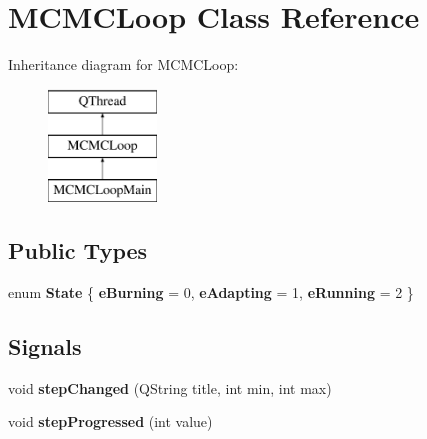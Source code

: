 \hypertarget{class_m_c_m_c_loop}{\section{M\-C\-M\-C\-Loop Class Reference}
\label{class_m_c_m_c_loop}
}
Inheritance diagram for M\-C\-M\-C\-Loop\-:\begin{figure}[H]
\begin{center}
\leavevmode
\includegraphics[height=3.000000cm]{class_m_c_m_c_loop}
\end{center}
\end{figure}
\subsection*{Public Types}
\begin{DoxyCompactItemize}
\item 
enum {\bfseries State} \{ {\bfseries e\-Burning} = 0, 
{\bfseries e\-Adapting} = 1, 
{\bfseries e\-Running} = 2
 \}
\end{DoxyCompactItemize}
\subsection*{Signals}
\begin{DoxyCompactItemize}
\item 
\hypertarget{class_m_c_m_c_loop_adad18b9f81fe65fa41fa8e0dbaf92969}{void {\bfseries step\-Changed} (Q\-String title, int min, int max)}\label{class_m_c_m_c_loop_adad18b9f81fe65fa41fa8e0dbaf92969}

\item 
\hypertarget{class_m_c_m_c_loop_a3f37a6212f91042d07ade6b96377cfd2}{void {\bfseries step\-Progressed} (int value)}\label{class_m_c_m_c_loop_a3f37a6212f91042d07ade6b96377cfd2}

\end{DoxyCompactItemize}
